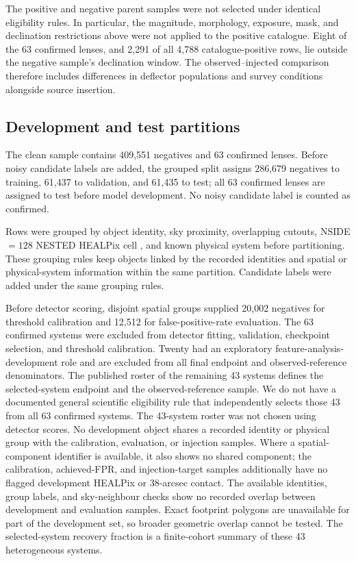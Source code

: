 The positive and negative parent samples were not selected under identical
eligibility rules. In particular, the magnitude, morphology, exposure, mask,
and declination restrictions above were not applied to the positive
catalogue. Eight of the 63 confirmed lenses, and 2,291 of all 4,788
catalogue-positive rows, lie outside the negative sample's declination
window. The observed--injected comparison therefore includes differences in
deflector populations and survey conditions alongside source insertion.

\subsection{Development and test partitions}
\label{sec:data_partitions}

The clean sample contains 409,551 negatives and 63 confirmed lenses. Before
noisy candidate labels are added, the grouped split assigns 286,679 negatives
to training, 61,437 to validation, and 61,435 to test; all 63 confirmed lenses
are assigned to test before model development. No noisy candidate label is
counted as confirmed.

Rows were grouped by object identity, sky proximity, overlapping cutouts,
NSIDE$=128$ NESTED HEALPix cell \citep{Gorski2005}, and known physical system
before partitioning. These grouping rules keep objects linked by the recorded
identities and spatial or physical-system information within the same
partition. Candidate labels were added under the same grouping rules.

Before detector scoring, disjoint spatial groups supplied 20,002 negatives
for threshold calibration and 12,512 for false-positive-rate evaluation. The
63 confirmed systems were excluded from detector fitting, validation,
checkpoint selection, and threshold calibration. Twenty had an exploratory
feature-analysis-development role and are excluded from all final endpoint and
observed-reference denominators. The published roster of the remaining 43
systems defines the selected-system endpoint and the observed-reference
sample. We do not have a documented general scientific eligibility rule that
independently selects those 43 from all 63 confirmed systems. The 43-system
roster was not chosen using detector scores.
No development object shares a recorded identity or physical group with the
calibration, evaluation, or injection samples. Where a spatial-component
identifier is available, it also shows no shared component; the calibration,
achieved-FPR, and injection-target samples additionally have no flagged
development HEALPix or 38-arcsec contact. The available identities, group
labels, and sky-neighbour checks show no recorded overlap between development
and evaluation samples. Exact footprint polygons are unavailable for part of
the development set, so broader geometric overlap cannot be tested. The
selected-system recovery fraction is a finite-cohort summary of these 43
heterogeneous systems.

